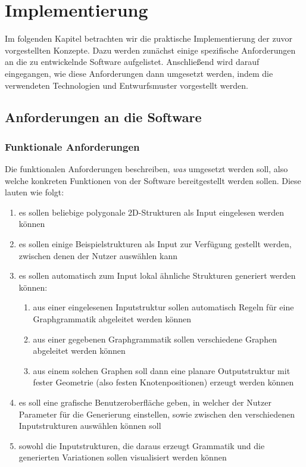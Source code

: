 %
\chapter{Implementierung}
Im folgenden Kapitel betrachten wir die praktische Implementierung der zuvor vorgestellten Konzepte. Dazu werden zunächst
einige spezifische Anforderungen an die zu entwickelnde Software aufgelistet. Anschließend wird darauf eingegangen, wie
diese Anforderungen dann umgesetzt werden, indem die verwendeten Technologien und Entwurfsmuster vorgestellt werden.

\section{Anforderungen an die Software}
\subsection{Funktionale Anforderungen}
Die funktionalen Anforderungen beschreiben, \textit{was} umgesetzt werden soll, also welche konkreten Funktionen von der Software
bereitgestellt werden sollen. Diese lauten wie folgt:

\begin{enumerate}
    \item es sollen beliebige polygonale 2D-Strukturen als Input eingelesen werden können
    \item es sollen einige Beispielstrukturen als Input zur Verfügung gestellt werden, zwischen denen der Nutzer auswählen kann
    \item es sollen automatisch zum Input lokal ähnliche Strukturen generiert werden können:
    \begin{enumerate}
        \item aus einer eingelesenen Inputstruktur sollen automatisch Regeln für eine Graphgrammatik abgeleitet werden können
        \item aus einer gegebenen Graphgrammatik sollen verschiedene Graphen abgeleitet werden können
        \item aus einem solchen Graphen soll dann eine planare Outputstruktur mit fester Geometrie (also festen Knotenpositionen) erzeugt werden können
    \end{enumerate}
    \item es soll eine grafische Benutzeroberfläche geben, in welcher der Nutzer Parameter für die Generierung einstellen, sowie zwischen den verschiedenen
    Inputstrukturen auswählen können soll
    \item sowohl die Inputstrukturen, die daraus erzeugt Grammatik und die generierten Variationen sollen visualisiert werden können
\end{enumerate}

